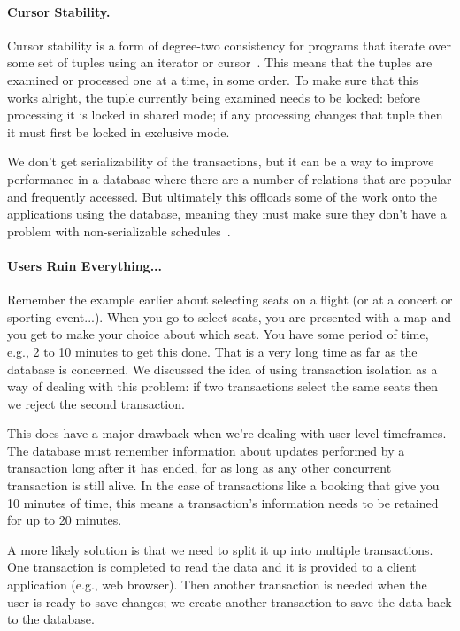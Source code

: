 \paragraph{Cursor Stability.} Cursor stability is a form of degree-two consistency for programs that iterate over some set of tuples using an iterator or cursor~\cite{dsc}. This means that the tuples are examined or processed one at a time, in some order. To make sure that this works alright, the tuple currently being examined needs to be locked: before processing it is locked in shared mode; if any processing changes that tuple then it must first be locked in exclusive mode. 

We don't get serializability of the transactions, but it can be a way to improve performance in a database where there are a number of relations that are popular and frequently accessed. But ultimately this offloads some of the work onto the applications using the database, meaning they must make sure they don't have a problem with non-serializable schedules~\cite{dsc}.

\paragraph{Users Ruin Everything...}
Remember the example earlier about selecting seats on a flight (or at a concert or sporting event...). When you go to select seats, you are presented with a map and you get to make your choice about which seat. You have some period of time, e.g., 2 to 10 minutes to get this done. That is a very long time as far as the database is concerned. We discussed the idea of using transaction isolation as a way of dealing with this problem: if two transactions select the same seats then we reject the second transaction.

This does have a major drawback when we're dealing with user-level timeframes. The database must remember information about updates performed by a transaction long after it has ended, for as long as any other concurrent transaction is still alive. In the case of transactions like a booking that give you 10 minutes of time, this means a transaction's information needs to be retained for up to 20 minutes. 

A more likely solution is that we need to split it up into multiple transactions. One transaction is completed to read the data and it is provided to a client application (e.g., web browser). Then another transaction is needed when the user is ready to save changes; we create another transaction to save the data back to the database. 

